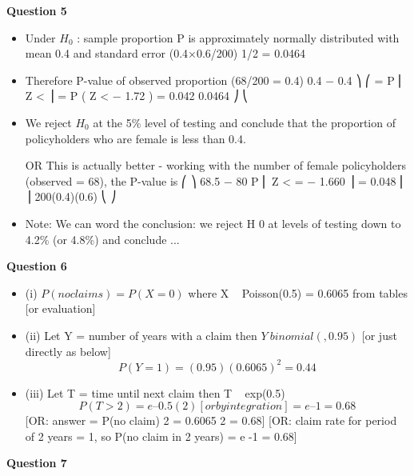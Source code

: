 \documentclass[a4paper,12pt]{article}
\begin{document}
\noindent \textbf{Question 5}
\begin{itemize}
\item Under $H_0$ : sample proportion P is approximately normally distributed with mean 0.4 and standard error (0.4×0.6/200) 1/2 = 0.0464
\item Therefore P-value of observed proportion (68/200 = 0.4)
0.4 − 0.4 ⎞
⎛
= P ⎜ Z <
⎟ = P ( Z < − 1.72 ) = 0.042
0.0464 ⎠
⎝
\item We reject $H_0$ at the 5\% level of testing and conclude that the proportion of
policyholders who are female is less than 0.4.
\item [OR This is actually better - working with the number of female policyholders
(observed = 68), the P-value is
⎛
⎞
68.5 − 80
P ⎜ Z <
= − 1.660 ⎟ = 0.048
⎜
⎟
200(0.4)(0.6)
⎝
⎠
]
\item Note: We can word the conclusion: we reject H 0 at levels of testing down to 4.2\% (or
4.8\%) and conclude ...
\end{itemize}
\noindent \textbf{Question 6}
\begin{itemize}
\item (i) $P(no claims) = P(X = 0)$ where X ~ Poisson(0.5)
= 0.6065 from tables [or evaluation]
\item (ii) Let Y = number of years with a claim
then $Y ~ binomial(,0.95)$ [or just directly as below]
\[P(Y = 1) = (0.95)(0.6065)^2 = 0.44\]
\item (iii)
Let T = time until next claim
then T ~ exp(0.5)
\[P(T > 2) = e –0.5(2) [or by integration]
= e –1 = 0.68\]
[OR: answer = {P(no claim)} 2 = 0.6065 2 = 0.68]
[OR: claim rate for period of 2 years = 1, so P(no claim in 2 years)
= e -1 = 0.68]
\end{itemize}
\noindent \textbf{Question 7}
\end{document}
